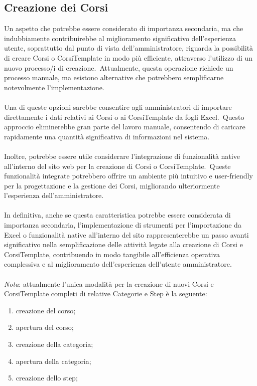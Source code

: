 \subsection{Creazione dei Corsi}\label{sec:cap_sec_subsec}
Un aspetto che potrebbe essere considerato di importanza secondaria, ma che indubbiamente contribuirebbe al miglioramento 
significativo dell'esperienza utente, soprattutto dal punto di vista dell'amministratore, 
riguarda la possibilità di creare Corsi o CorsiTemplate in modo più efficiente, attraverso l'utilizzo di un nuovo processo/i di creazione.\ 
Attualmente, questa operazione richiede un processo manuale, ma esistono alternative 
che potrebbero semplificarne notevolmente l'implementazione.
\\ \\
Una di queste opzioni sarebbe consentire agli amministratori di importare direttamente i dati relativi ai Corsi o ai CorsiTemplate 
da fogli Excel.\ Questo approccio eliminerebbe gran parte del lavoro manuale, 
consentendo di caricare rapidamente una quantità significativa di informazioni nel sistema.
\\ \\
Inoltre, potrebbe essere utile considerare l'integrazione di funzionalità native all'interno del sito web per la creazione 
di Corsi o CorsiTemplate.\ Queste funzionalità integrate potrebbero offrire un ambiente più intuitivo e user-friendly 
per la progettazione e la gestione dei Corsi, migliorando ulteriormente l'esperienza dell'amministratore.
\\ \\
In definitiva, anche se questa caratteristica potrebbe essere considerata di importanza secondaria, 
l'implementazione di strumenti per l'importazione da Excel o funzionalità native all'interno del sito 
rappresenterebbe un passo avanti significativo nella semplificazione delle attività legate alla creazione di Corsi e CorsiTemplate, 
contribuendo in modo tangibile all'efficienza operativa complessiva e al miglioramento dell'esperienza dell'utente amministratore. 
\\ \\
\textit{Nota}: attualmente l'unica modalità per la creazione di nuovi Corsi e CorsiTemplate completi di relative Categorie e Step è la seguente:
\begin{enumerate}
    \item creazione del corso;
    \item apertura del corso;
    \item creazione della categoria;
    \item apertura della categoria;
    \item creazione dello step;
\end{enumerate}
%
